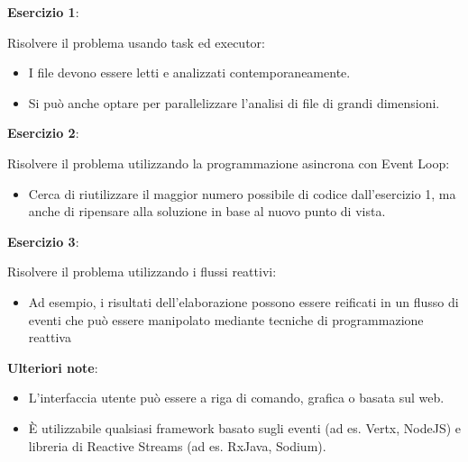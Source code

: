 \documentclass[a4paper]{article}
\begin{document}
\textbf{Esercizio 1}:

Risolvere il problema usando task ed executor:

        \begin{itemize}

            \item I file devono essere letti e analizzati contemporaneamente.

            \item Si pu\`o anche optare per parallelizzare l'analisi di file di grandi dimensioni.

        \end{itemize}

\textbf{Esercizio 2}:

Risolvere il problema utilizzando la programmazione asincrona con Event Loop:

        \begin{itemize}

            \item Cerca di riutilizzare il maggior numero possibile di codice dall'esercizio 1, ma anche di ripensare alla soluzione in base al nuovo punto di vista.

        \end{itemize}

\textbf{Esercizio 3}:

Risolvere il problema utilizzando i flussi reattivi:

        \begin{itemize}

            \item Ad esempio, i risultati dell'elaborazione possono essere reificati in un flusso di eventi che pu\`o essere manipolato mediante tecniche di programmazione reattiva

        \end{itemize}

\textbf{Ulteriori note}:

\begin{itemize}

    \item L'interfaccia utente pu\`o essere a riga di comando, grafica o basata sul web.
%

    \item È utilizzabile qualsiasi framework basato sugli eventi (ad es.
%
Vertx, NodeJS) e libreria di Reactive Streams (ad es.
%
RxJava, Sodium).

\end{itemize}
\end{document}
